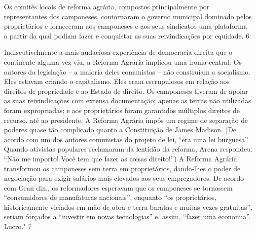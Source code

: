 \par
 
Os comitês locais de reforma agrária, compostos principalmente por representantes dos camponeses, contornaram o governo municipal dominado pelos proprietários e forneceram aos camponeses e aos seus sindicatos uma plataforma a partir da qual podiam fazer e conquistar as suas reivindicações por equidade.
 {\color{blue} 6}  

 
\par
 
Indiscutivelmente a mais audaciosa experiência de democracia direita que o continente alguma vez viu, a Reforma Agrária implicou uma ironia central. Os autores da legislação – a maioria deles comunistas – não construíam o socialismo. Eles estavam criando o capitalismo. Eles eram escrupulosos em relação aos direitos de propriedade e ao Estado de direito. Os camponeses tiveram de apoiar as suas reivindicações com extensa documentação; apenas as terras não utilizadas foram expropriadas; e aos proprietários foram garantidos múltiplos direitos de recurso, até ao presidente. A Reforma Agrária impôs um regime de separação de poderes quase tão complicado quanto a Constituição de James Madison. (De acordo com um dos autores comunistas do projeto de lei, “era uma lei burguesa”. Quando ativistas populares reclamaram da lentidão da reforma, Arena respondeu: “Não me importo! Você tem que fazer as coisas direito!”) A Reforma Agrária transformou os camponeses sem terra em proprietários, dando-lhes o poder de negociação para exigir salários mais elevados aos seus empregadores. De acordo com Gran din., os reformadores esperavam que os camponeses se tornassem “consumidores de manufaturas nacionais”, enquanto “os proprietários, historicamente viciados em mão de obra e terra baratas e muitas vezes gratuitas”, seriam forçados a “investir em novas tecnologias” e, assim, “fazer uma economia”. Lucro."
 {\color{blue} 7}  

 
\par
 
